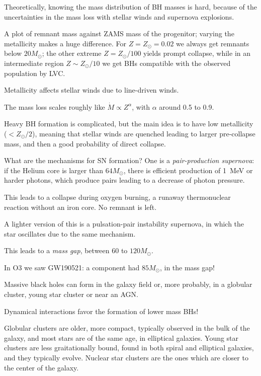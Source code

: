\documentclass[main.tex]{subfiles}
\begin{document}
Theoretically, knowing the mass distribution of BH masses is hard, 
because of the uncertainties in the mass loss with stellar winds and supernova explosions. 

A plot of remnant mass against ZAMS mass of the progenitor; 
varying the metallicity makes a huge difference. 
For \(Z = Z_{\odot} = 0.02\) we always get remnants below \(20 M_{\odot}\); 
the other extreme \(Z = Z_{\odot}  / 100\) yields prompt collapse, 
while in an intermediate region \(Z \sim Z_{\odot} / 10\) we get BHs 
compatible with the observed population by LVC. 

Metallicity affects stellar winds due to line-driven winds. 

The mass loss scales roughly like \(\dot{M} \propto Z^{\alpha }\), with \(\alpha \) around 0.5 to 0.9.

Heavy BH formation is complicated, but the main idea is to have low metallicity (\(< Z_{\odot} / 2\)), meaning that stellar winds are quenched leading to larger pre-collapse mass, and then a good probability of direct collapse. 

What are the mechanisms for SN formation?
One is a \emph{pair-production supernova}: if the Helium core is larger than \(64M_{\odot}\), there is efficient production of \SI{1}{MeV} or harder photons, which produce pairs leading to a decrease of photon pressure. 

This leads to a collapse during oxygen burning, a runaway thermonuclear reaction without an iron core. No remnant is left. 

A lighter version of this is a pulsation-pair instability supernova, in which the star oscillates due to the same mechanism. 

This leads to a \emph{mass gap}, between 60 to \(120M_{\odot}\). 

In O3 we saw GW190521: a component had \(85M_{\odot}\), in the mass gap! 

Massive black holes can form in the galaxy field or, more probably, in a globular cluster, young star cluster or near an AGN. 

Dynamical interactions favor the formation of lower mass BHs! 

Globular clusters are older, more compact, typically observed in the bulk of the galaxy, and most stars are of the same age, in elliptical galaxies. 
Young star clusters are less graitationally bound, found in both spiral and elliptical galaxies, and they typically evolve. 
Nuclear star clusters are the ones which are closer to the center of the galaxy. 
\end{document}
